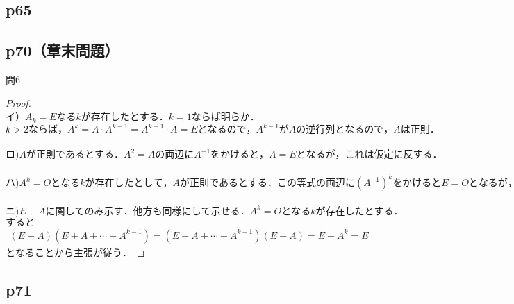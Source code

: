 \documentclass[dvipdfmx,uplatex,11pt]{jsarticle}
\begin{document}
\subsection{p65}
%
%
%
\newpage
%
%
%
\subsection{p70（章末問題）}
問6\\
\noindent
\begin{leftbar}
\begin{proof}
~\\
イ）$A_k=Eなるkが存在したとする．k = 1 ならば明らか．$\\
$k>2ならば，A^k=A·A^{k-1}=A^{k-1}· A = E となるので，A^{k-1}がAの逆行列となるので，Aは正則．$\\
\\
$ロ)Aが正則であるとする．A^2=Aの両辺にA^{-1}をかけると，A=Eとなるが，これは仮定に反する．$\\
\\
$ハ)A^k=Oとなる k が存在したとして，A が正則であるとする．この等式の両辺に (A^{−1})^kをかけるとE=Oとなるが，これは明らかに矛盾．$\\
\\
$ニ)E−A に関してのみ示す．他方も同様にして示せる．A^{k}=Oとなるkが存在したとする．$\\
$すると$
\begin{eqnarray*}
(E − A)(E+A+ \cdots +A^{k−1})=(E+A+ \cdots + A^{k−1})(E−A)=E−A^k=E
\end{eqnarray*}
$となることから主張が従う．$
\end{proof}
\end{leftbar}
%
%
%
\newpage
%
%
%
\setcounter{equation}{0}
\subsection{p71}
%
%
%
\end{document}
